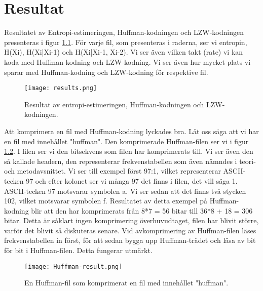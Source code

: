 
\chapter{Resultat}
\label{cha:results}

Resultatet av Entropi-estimeringen, Huffman-kodningen och LZW-kodningen presenteras i figur \ref{fig:results}. För varje fil, som presenteras i raderna, ser vi entropin, H(Xi), H(Xi|Xi-1) och H(Xi|Xi-1, Xi-2). Vi ser även vilken takt (rate) vi kan koda med Huffman-kodning och LZW-kodning. Vi ser även hur mycket plats vi sparar med Huffman-kodning och LZW-kodning för respektive fil.
\begin{figure}
  \texttt{[image: results.png]}
  \caption{Resultat av entropi-estimeringen, Huffman-kodningen och LZW-kodningen.}
  \label{fig:results}
\end{figure}

Att komprimera en fil med Huffman-kodning lyckades bra. Låt oss säga att vi har en fil med innehållet "huffman". Den komprimerade Huffman-filen ser vi i figur \ref{fig:huffmanresults}. I filen ser vi den bitsekvens som filen har komprimerats till. Vi ser även den så kallade headern, den representerar frekvenstabellen som även nämndes i teori- och metodavsnittet. Vi ser till exempel först 97:1, vilket representerar ASCII-tecken 97 och efter kolonet ser vi många 97 det finns i filen, det vill säga 1. ASCII-tecken 97 motsvarar symbolen a. Vi ser sedan att det finns två stycken 102, vilket motsvarar symbolen f. Resultatet av detta exempel på Huffman-kodning blir att den har komprimerats från 8*7 = 56 bitar till 36*8 + 18 = 306 bitar. Detta är såklart ingen komprimering överhuvudtaget, filen har blivit större, varför det blivit så diskuteras senare. Vid avkomprimering av Huffman-filen läses frekvenstabellen in först, för att sedan bygga upp Huffman-trädet och läsa av bit för bit i Huffman-filen. Detta fungerar utmärkt.
\begin{figure}
  \texttt{[image: Huffman-result.png]}
  \caption{En Huffman-fil som komprimerat en fil med innehållet "huffman".}
  \label{fig:huffmanresults}
\end{figure}


